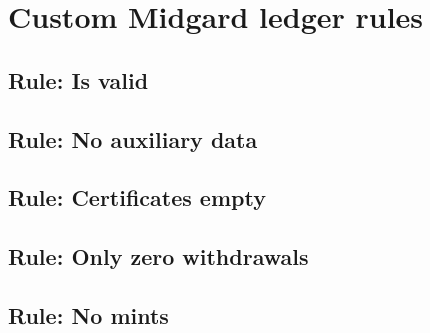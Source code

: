 \documentclass[../midgard.tex]{subfiles}
\begin{document}
\section{Custom Midgard ledger rules}
\label{h:custom-midgard-ledger-rules}

\subsection{Rule: Is valid}


\subsection{Rule: No auxiliary data}


\subsection{Rule: Certificates empty}


\subsection{Rule: Only zero withdrawals}

\subsection{Rule: No mints}

\end{document}
